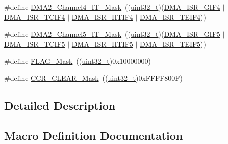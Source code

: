 \begin{DoxyCompactItemize}
\item 
\#define \hyperlink{group___d_m_a___private___defines_gae844f9b933a07a6f75472c3f849cbb5c}{D\+M\+A2\+\_\+\+Channel4\+\_\+\+I\+T\+\_\+\+Mask}~((\hyperlink{_p_e___types_8h_a33594304e786b158f3fb30289278f5af}{uint32\+\_\+t})(\hyperlink{openmotestm_2library_2inc_2stm32f10x__map_8h_af4f69823d44810c353af1f0a89eaf180}{D\+M\+A\+\_\+\+I\+S\+R\+\_\+\+G\+I\+F4} $\vert$ \hyperlink{openmotestm_2library_2inc_2stm32f10x__map_8h_ad7d4e46949a35cf037a303bd65a0c87a}{D\+M\+A\+\_\+\+I\+S\+R\+\_\+\+T\+C\+I\+F4} $\vert$ \hyperlink{openmotestm_2library_2inc_2stm32f10x__map_8h_a684cf326c770f1ab21c604a5f62907ad}{D\+M\+A\+\_\+\+I\+S\+R\+\_\+\+H\+T\+I\+F4} $\vert$ \hyperlink{openmotestm_2library_2inc_2stm32f10x__map_8h_a12fcc1471918f3e7b293b2d825177253}{D\+M\+A\+\_\+\+I\+S\+R\+\_\+\+T\+E\+I\+F4}))
\item 
\#define \hyperlink{group___d_m_a___private___defines_gaedaf3e94d362754266807d6ccbab2e3e}{D\+M\+A2\+\_\+\+Channel5\+\_\+\+I\+T\+\_\+\+Mask}~((\hyperlink{_p_e___types_8h_a33594304e786b158f3fb30289278f5af}{uint32\+\_\+t})(\hyperlink{openmotestm_2library_2inc_2stm32f10x__map_8h_a83d4d9cba635d1e33e3477b773379cfd}{D\+M\+A\+\_\+\+I\+S\+R\+\_\+\+G\+I\+F5} $\vert$ \hyperlink{openmotestm_2library_2inc_2stm32f10x__map_8h_a5ea57d09f13edbd6ad8afe9465e0fa70}{D\+M\+A\+\_\+\+I\+S\+R\+\_\+\+T\+C\+I\+F5} $\vert$ \hyperlink{openmotestm_2library_2inc_2stm32f10x__map_8h_a3d1f2b8c82b1e20b4311af8ca9576736}{D\+M\+A\+\_\+\+I\+S\+R\+\_\+\+H\+T\+I\+F5} $\vert$ \hyperlink{openmotestm_2library_2inc_2stm32f10x__map_8h_a42f9b12c4c80cbb7cd0f94f139c73de3}{D\+M\+A\+\_\+\+I\+S\+R\+\_\+\+T\+E\+I\+F5}))
\item 
\#define \hyperlink{group___d_m_a___private___defines_ga2be62bf481cd44de9ab604efe5595ff6}{F\+L\+A\+G\+\_\+\+Mask}~((\hyperlink{_p_e___types_8h_a33594304e786b158f3fb30289278f5af}{uint32\+\_\+t})0x10000000)
\item 
\#define \hyperlink{group___d_m_a___private___defines_gac2c71cc75907c7c3467907e766dc4188}{C\+C\+R\+\_\+\+C\+L\+E\+A\+R\+\_\+\+Mask}~((\hyperlink{_p_e___types_8h_a33594304e786b158f3fb30289278f5af}{uint32\+\_\+t})0x\+F\+F\+F\+F800\+F)
\end{DoxyCompactItemize}


\subsection{Detailed Description}


\subsection{Macro Definition Documentation}
